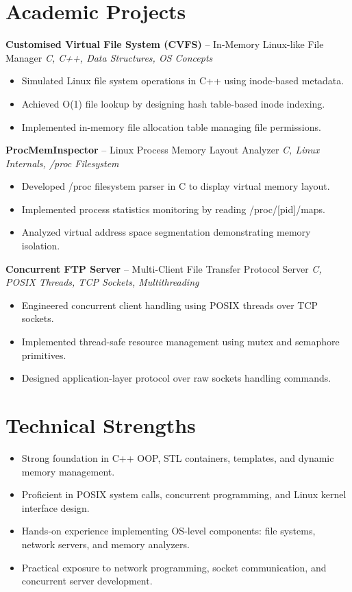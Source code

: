 \documentclass[10.5pt,a4paper]{article}
\begin{document}
\section{Academic Projects}
\textbf{Customised Virtual File System (CVFS)} -- In-Memory Linux-like File Manager \hfill \textit{C, C++, Data Structures, OS Concepts}
\begin{itemize}
  \item Simulated Linux file system operations in C++ using inode-based metadata.
  \item Achieved O(1) file lookup by designing hash table-based inode indexing.
  \item Implemented in-memory file allocation table managing file permissions.
\end{itemize}
\vspace{2pt}
\textbf{ProcMemInspector} -- Linux Process Memory Layout Analyzer \hfill \textit{C, Linux Internals, /proc Filesystem}
\begin{itemize}
  \item Developed /proc filesystem parser in C to display virtual memory layout.
  \item Implemented process statistics monitoring by reading /proc/[pid]/maps.
  \item Analyzed virtual address space segmentation demonstrating memory isolation.
\end{itemize}
\vspace{2pt}
\textbf{Concurrent FTP Server} -- Multi-Client File Transfer Protocol Server \hfill \textit{C, POSIX Threads, TCP Sockets, Multithreading}
\begin{itemize}
  \item Engineered concurrent client handling using POSIX threads over TCP sockets.
  \item Implemented thread-safe resource management using mutex and semaphore primitives.
  \item Designed application-layer protocol over raw sockets handling commands.
\end{itemize}
\section{Technical Strengths}
\begin{itemize}
  \item Strong foundation in C++ OOP, STL containers, templates, and dynamic memory management.
  \item Proficient in POSIX system calls, concurrent programming, and Linux kernel interface design.
  \item Hands-on experience implementing OS-level components: file systems, network servers, and memory analyzers.
  \item Practical exposure to network programming, socket communication, and concurrent server development.
\end{itemize}
\end{document}

